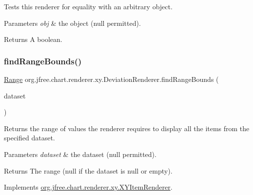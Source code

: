 Tests this renderer for equality with an arbitrary object.


\begin{DoxyParams}{Parameters}
{\em obj} & the object ({\ttfamily null} permitted).\\
\hline
\end{DoxyParams}
\begin{DoxyReturn}{Returns}
A boolean. 
\end{DoxyReturn}
\mbox{\label{classorg_1_1jfree_1_1chart_1_1renderer_1_1xy_1_1_deviation_renderer_a64df62469b198e1978d615f2c6bf5b36}} 
\subsubsection{\texorpdfstring{find\+Range\+Bounds()}{findRangeBounds()}}
{\footnotesize\ttfamily \mbox{\hyperlink{classorg_1_1jfree_1_1data_1_1_range}{Range}} org.\+jfree.\+chart.\+renderer.\+xy.\+Deviation\+Renderer.\+find\+Range\+Bounds (\begin{DoxyParamCaption}\item[{\mbox{\hyperlink{interfaceorg_1_1jfree_1_1data_1_1xy_1_1_x_y_dataset}{X\+Y\+Dataset}}}]{dataset }\end{DoxyParamCaption})}

Returns the range of values the renderer requires to display all the items from the specified dataset.


\begin{DoxyParams}{Parameters}
{\em dataset} & the dataset ({\ttfamily null} permitted).\\
\hline
\end{DoxyParams}
\begin{DoxyReturn}{Returns}
The range ({\ttfamily null} if the dataset is {\ttfamily null} or empty). 
\end{DoxyReturn}


Implements \mbox{\hyperlink{interfaceorg_1_1jfree_1_1chart_1_1renderer_1_1xy_1_1_x_y_item_renderer_af9ac6f440e99c73d343de7851e89496a}{org.\+jfree.\+chart.\+renderer.\+xy.\+X\+Y\+Item\+Renderer}}.

